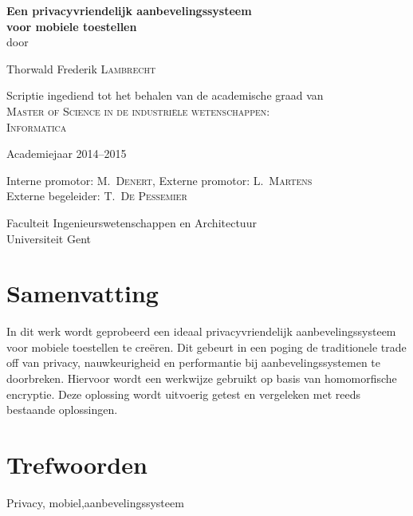 
\newpage
{}
{
\setlength{\baselineskip}{12pt}
\setlength{\parindent}{0pt}
\setlength{\parskip}{6pt}

\begin{center}

\renewcommand{\baselinestretch}{1.1}
\noindent \huge \textbf{
Een privacyvriendelijk aanbevelingssysteem \\
voor mobiele toestellen 
} \\
\renewcommand{\baselinestretch}{1.3}
\normalsize
\vspace{3mm}
door 

Thorwald Frederik \textsc{Lambrecht}

Scriptie ingediend tot het behalen van de academische graad van\\
\textsc{Master of Science in de industri\"ele wetenschappen: \\Informatica}

Academiejaar 2014--2015

Interne promotor: M.~\textsc{Denert},
Externe promotor: L.~\textsc{Martens}\\
Externe begeleider: T.~\textsc{De Pessemier}

Faculteit Ingenieurswetenschappen en Architectuur\\
Universiteit Gent


\end{center}

\section*{Samenvatting}
In dit werk wordt geprobeerd een ideaal privacyvriendelijk aanbevelingssysteem voor mobiele toestellen te cre\"eren. Dit gebeurt in een poging de traditionele trade off van privacy, nauwkeurigheid en performantie bij aanbevelingssystemen te doorbreken. Hiervoor wordt een werkwijze gebruikt op basis van homomorfische encryptie. Deze oplossing wordt uitvoerig getest en vergeleken met reeds bestaande oplossingen.

\section*{Trefwoorden}
Privacy, mobiel,aanbevelingssysteem
}

\newpage %
